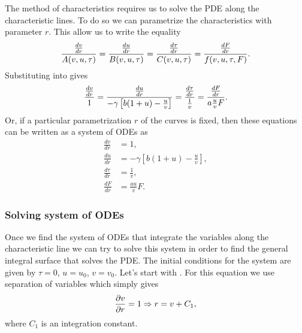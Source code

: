 The method of characteristics requires us to solve the PDE along the
characteristic lines. To do so we can parametrize the characteristics with
parameter $r$. This allow us to write the equality
\begin{equation}
  {{dv \over dr} \over A(v, u, \tau)} =
  {{du \over dr} \over B(v, u, \tau)} =
  {{d\tau \over dr} \over C(v, u, \tau)} =
  {{dF \over dr} \over f(v, u, \tau, F)}.
  \label{eq_lagrange_charpit}
\end{equation}
Substituting  into  gives
\begin{equation}
  {{dv \over dr} \over 1} =
  {{du \over dr} \over - \gamma \left[ b (1 + u) - \frac{u}{v} \right]} =
  {{d\tau \over dr} \over {1 \over v}} =
  {{dF \over dr} \over a \frac{u}{v} F}.
\end{equation}
Or, if a particular parametrization $r$ of the curves is fixed, then these
equations can be written as a system of ODEs as
\begin{align}
  \frac{d v}{d r} &= 1,
  \label{eq_ODE_1}\\
  \frac{d u}{d r} &= - \gamma \left[ b (1 + u) - \frac{u}{v}
  \right],
  \label{eq_ODE_2}\\
  \frac{d \tau}{d r} &= \frac{1}{v},
  \label{eq_ODE_3}\\
  \frac{d F}{d r} &= \frac{a u}{v} F.
  \label{eq_ODE_4}
\end{align}

\subsubsection{Solving system of ODEs}

Once we find the system of ODEs that integrate the variables along the
characteristic line we can try to solve this system in order to find the general
integral surface that solves the PDE. The initial conditions for the system are
given by $\tau = 0$, $u = u_0$, $v = v_0$. Let's start with .
For this equation we use separation of variables which simply gives
\begin{equation}
  {\partial v \over \partial r} = 1 \Rightarrow
  r = v + C_1,
  \label{eq_ODE_sol_1}
\end{equation}
where $C_1$ is an integration constant.

